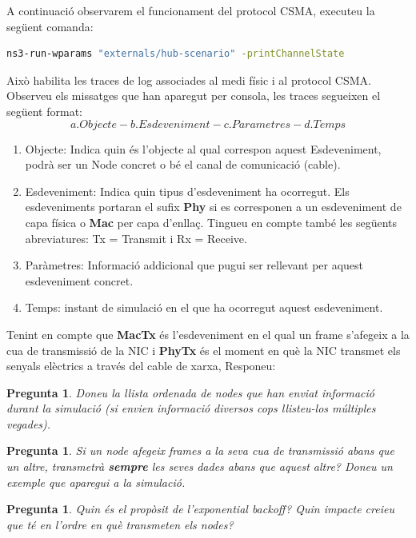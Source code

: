 \documentclass[12pt,a4paper]{article}
\newcounter{exercises}
\newtheorem{exer}[exercises]{Pregunta}
\begin{document}
\begin{enumerate}
A continuació observarem el funcionament del protocol CSMA, executeu la següent comanda:

\begin{lstlisting}[language=bash,basicstyle=\footnotesize]
   ns3-run-wparams "externals/hub-scenario" -printChannelState
\end{lstlisting}
Això habilita les traces de log associades al medi físic i al protocol CSMA. Observeu els missatges que han aparegut per consola, les traces segueixen el següent format:
$$
a. Objecte  - b. Esdeveniment - c. Parametres - d. Temps $$

\begin{enumerate}
\item Objecte: Indica quin és l'objecte al qual correspon aquest Esdeveniment, podrà ser un Node concret o bé el canal de comunicació (cable).
\item Esdeveniment: Indica quin tipus d'esdeveniment ha ocorregut. Els esdeveniments portaran el sufix \textbf{Phy} si es corresponen a un esdeveniment de capa física o \textbf{Mac} per capa d'enllaç. Tingueu en compte també les següents abreviatures: Tx = Transmit i Rx = Receive.
\item Paràmetres: Informació addicional que pugui ser rellevant per aquest esdeveniment concret.
\item Temps: instant de simulació en el que ha ocorregut aquest esdeveniment.
\end{enumerate}

Tenint en compte que \textbf{MacTx} és l'esdeveniment en el qual un frame s'afegeix a la cua de transmissió de la NIC i \textbf{PhyTx} és el moment en què la NIC transmet els senyals elèctrics a través del cable de xarxa, Responeu:
\begin{exer} Doneu la llista ordenada de nodes que han enviat informació durant la simulació (si envien informació diversos cops llisteu-los múltiples vegades).\end{exer}
\begin{exer} Si un node afegeix frames a la seva cua de transmissió abans que un altre, transmetrà \textbf{sempre} les seves dades abans que aquest altre? Doneu un exemple que aparegui a la simulació.
\end{exer}
\begin{exer} Quin és el propòsit de l'exponential backoff? Quin impacte creieu que té en l'ordre en què transmeten els nodes? \end{exer}
\end{enumerate}
\end{document}
